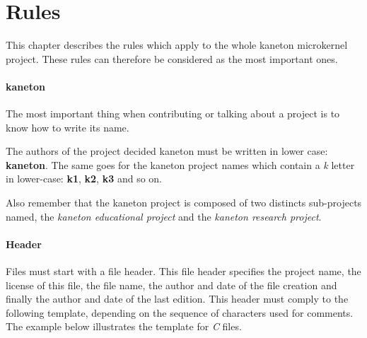 %
%
%
%
%
%

%
%

\chapter{Rules}
\label{chapter:rules}

This chapter describes the rules which apply to the whole kaneton microkernel
project. These rules can therefore be considered as the most important ones.

\newpage

%
%


\subsubsection{kaneton}

The most important thing when contributing or talking about a project is
to know how to write its name.

The authors of the project decided kaneton must be written in lower case:
\textbf{kaneton}. The same goes for the kaneton project names which contain
a \textit{k} letter in lower-case: \textbf{k1}, \textbf{k2}, \textbf{k3} and
so on.

Also remember that the kaneton project is composed of two distincts
sub-projects named, the \textit{kaneton educational project} and the
\textit{kaneton research project}.


\subsubsection{Header}

Files must start with a file header. This file header specifies the
project name, the license of this file, the file name, the author and
date of the file creation and finally the author and date of the last
edition. This header must comply to the following template, depending
on the sequence of characters used for comments. The example below illustrates
the template for \textit{C} files.

